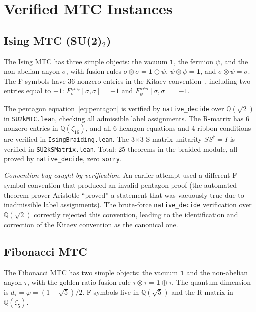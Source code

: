 \documentclass[12pt]{article}
\newcommand{\lean}[1]{\texttt{#1}}
\newcommand{\sorry}{\texttt{sorry}}
\newcommand{\nativedecide}{\texttt{native\_decide}}
\begin{document}
\section{Verified MTC Instances}
\label{sec:instances}

\subsection{Ising MTC (SU(2)$_2$)}

The Ising MTC has three simple objects: the vacuum $\mathbf{1}$, the fermion $\psi$, and the non-abelian anyon $\sigma$, with fusion rules $\sigma \otimes \sigma = \mathbf{1} \oplus \psi$, $\psi \otimes \psi = \mathbf{1}$, and $\sigma \otimes \psi = \sigma$. The F-symbols have 36 nonzero entries in the Kitaev convention~\cite{kitaev2006}, including two entries equal to $-1$: $F^{\psi\sigma\psi}_\sigma[\sigma,\sigma] = -1$ and $F^{\sigma\psi\sigma}_\psi[\sigma,\sigma] = -1$.

The pentagon equation~\eqref{eq:pentagon} is verified by \nativedecide{} over $\mathbb{Q}(\sqrt{2})$ in \lean{SU2kMTC.lean}, checking all admissible label assignments. The R-matrix has 6 nonzero entries in $\mathbb{Q}(\zeta_{16})$, and all 6 hexagon equations and 4 ribbon conditions are verified in \lean{IsingBraiding.lean}. The 3$\times$3 S-matrix unitarity $SS^\dagger = I$ is verified in \lean{SU2kSMatrix.lean}. Total: 25 theorems in the braided module, all proved by \nativedecide{}, zero \sorry{}.

\emph{Convention bug caught by verification.} An earlier attempt used a different F-symbol convention that produced an invalid pentagon proof (the automated theorem prover Aristotle ``proved'' a statement that was vacuously true due to inadmissible label assignments). The brute-force \nativedecide{} verification over $\mathbb{Q}(\sqrt{2})$ correctly rejected this convention, leading to the identification and correction of the Kitaev convention as the canonical one.

\subsection{Fibonacci MTC}

The Fibonacci MTC has two simple objects: the vacuum $\mathbf{1}$ and the non-abelian anyon $\tau$, with the golden-ratio fusion rule $\tau \otimes \tau = \mathbf{1} \oplus \tau$. The quantum dimension is $d_\tau = \varphi = (1+\sqrt{5})/2$. F-symbols live in $\mathbb{Q}(\sqrt{5})$ and the R-matrix in $\mathbb{Q}(\zeta_5)$.
\end{document}
